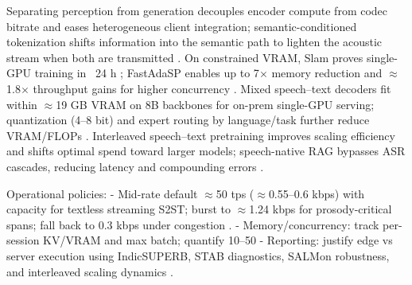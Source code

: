 \documentclass{article}
\begin{document}
Separating perception from generation decouples encoder compute from codec bitrate and eases heterogeneous client integration; semantic-conditioned tokenization shifts information into the semantic path to lighten the acoustic stream when both are transmitted \cite{hu2025salmduplexefficientdirectmodelingspeechl,yang2025diffsoundstreamefficientspeechtokenizati}. On constrained VRAM, Slam proves single-GPU training in ~24 h \cite{maimon2025slammingtrainingspeechlanguagemodelonegp}; FastAdaSP enables up to 7$\times$ memory reduction and $\approx$1.8$\times$ throughput gains for higher concurrency \cite{lu2024fastadaspmultitaskadaptedefficientinfere}. Mixed speech--text decoders fit within $\approx$19 GB VRAM on 8B backbones for on-prem single-GPU serving; quantization (4--8 bit) and expert routing by language/task further reduce VRAM/FLOPs \cite{dao2025ichigomixedmodalearlyfusionrealtimevoice,lu2024fastadaspmultitaskadaptedefficientinfere}. Interleaved speech--text pretraining improves scaling efficiency and shifts optimal spend toward larger models; speech-native RAG bypasses ASR cascades, reducing latency and compounding errors \cite{maimon2025scalinganalysisinterleavedspeechtextlang,min2025speechretrievalaugmentedgenerationwithou,wang2023slmbridgethingapbetweenspeechtextfoundat,maimon2025slammingtrainingspeechlanguagemodelonegp}.

Operational policies:
- Mid-rate default $\approx$50 tps ($\approx$0.55--0.6 kbps) with capacity for textless streaming S2ST; burst to $\approx$1.24 kbps for prosody-critical spans; fall back to 0.3 kbps under congestion \cite{zhao2024textlessstreamingspeechtranslationsemant,yang2025diffsoundstreamefficientspeechtokenizati,xue2025hhcodechighcompressionfidelitydiscretene}.
- Memory/concurrency: track per-session KV/VRAM and max batch; quantify 10--50%
- Reporting: justify edge vs server execution using IndicSUPERB, STAB diagnostics, SALMon robustness, and interleaved scaling dynamics \cite{entry2025indicsuperbspeechprocessinguniversalperf,vashishth2024stabspeechtokenizerassessmentbenchmark,maimon2025salmonsuiteacousticlanguagemodelevaluati,maimon2025scalinganalysisinterleavedspeechtextlang}.
\end{document}
